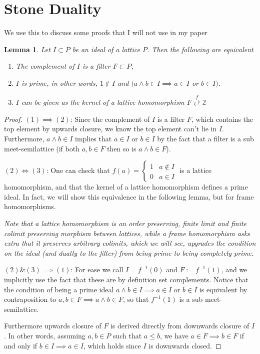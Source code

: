 \documentclass[12pt,a4paper]{article}
\newtheorem{lemma}{Lemma}[section] %
\begin{document}
\pagestyle{fancy}
\fancyhf{}
\rfoot{\thepage}
\section{Stone Duality}
We use this to discuss some proofs that I will not use in my paper

\begin{lemma}
	Let $I \subset P$ be an ideal of a lattice $P$. Then the following are equivalent 
	\begin{enumerate}
		\item The complement of $I$ is a filter $F \subset P$,
		\item $I$ is prime, in other words, $1 \notin I$ and $(a \land b \in I \implies a \in I$ or $b \in I)$.
		\item $I$ can be given as the kernel of a lattice homomorphism $F \stackrel{f}{\rightleftarrows} \mathbb{2}$
	\end{enumerate}
\end{lemma}
\begin{proof}
	$(1) \implies (2)$: Since the complement of $I$ is a filter $F$, which contains the top element by upwards closure, we know the top element can't lie in $I$. Furthermore, $a \land b \in I$ implies that $a \in I$ or $b \in I$ by the fact that a filter is a sub meet-semilattice (if both $a, b \in F$ then so is $a \land b \in F$).
	
	$(2) \iff (3)$: One can check that  $f(a) =  \begin{cases}
   1 & a \notin I \\
    0 & a \in I
  \end{cases}$ is a lattice homomorphism, and that the kernel of a lattice homomorphism defines a prime ideal. In fact, we will show this equivalence in the following lemma, but for frame homomorphisms. 
  
  \emph{Note that a lattice homomorphism is an order preserving, finite limit and finite colimit preserving morphism between lattices, while a frame homomorphism asks extra that it preserves arbitrary colimits, which we will see, upgrades the condition on the ideal (and dually to the filter) from being prime to being completely prime.}
  
  $(2) \& (3) \implies (1)$:  For ease we call $I = f^{-1}(0)$ and $F:= f^{-1}(1)$, and we implicitly use the fact that these are by definition set complements. Notice that the condition of being a prime ideal $a \land b \in I \implies a \in I$ or $b \in I$ is equivalent by contraposition to $a, b \in F \implies a \land b \in F$, so that $f^{-1}(1)$ is a sub meet-semilattice.
  
  Furthermore upwards closure of $F$ is derived directly from downwards closure of $I$. In other words, assuming $a, b \in P$ such that $a \leq b$, we have $a \in F \implies b \in F$ if and only if $ b \in I\implies a \in I$, which holds since $I$ is downwards closed.
\end{proof}
\end{document}
